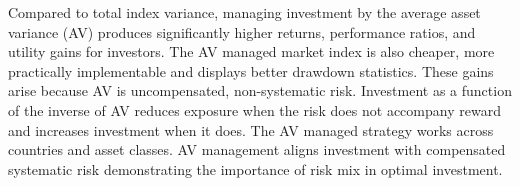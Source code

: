 \begin{doublespace}

\noindent Compared to total index variance, managing investment by the average asset variance (AV) produces significantly higher returns, performance ratios, and utility gains for investors. The AV managed market index is also cheaper, more practically implementable and displays better drawdown statistics. These gains arise because AV is uncompensated, non-systematic risk. Investment as a function of the inverse of AV reduces exposure when the risk does not accompany reward and increases investment when it does. The AV managed strategy works across countries and asset classes.  AV management aligns investment with compensated systematic risk demonstrating the importance of risk mix in optimal investment.

\end{doublespace}
